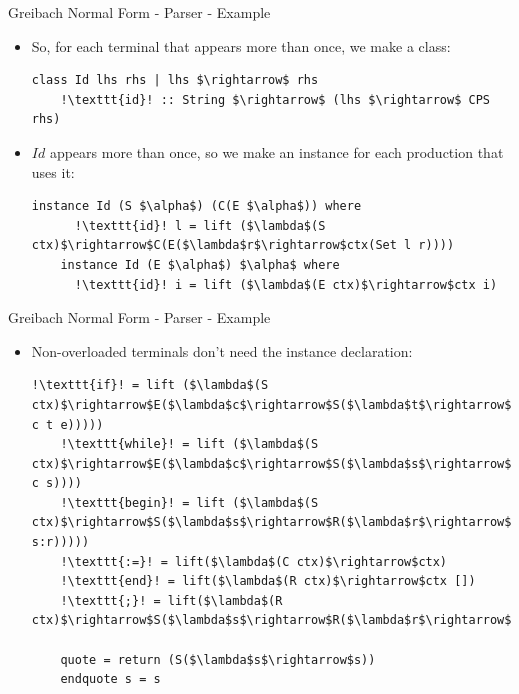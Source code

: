 \documentclass[10pt]{beamer}
\begin{document}
\begin{frame}[fragile]{Greibach Normal Form - Parser - Example}

\begin{itemize}

\item So, for each terminal that appears more than once, we make a class:
\begin{lstlisting}[mathescape=true, escapechar=!]
	class Id lhs rhs | lhs $\rightarrow$ rhs
	!\texttt{id}! :: String $\rightarrow$ (lhs $\rightarrow$ CPS rhs)
\end{lstlisting}

\item $Id$ appears more than once, so we make an instance for each production that uses it:
\begin{lstlisting}[mathescape=true, escapechar=!]
	instance Id (S $\alpha$) (C(E $\alpha$)) where
	  !\texttt{id}! l = lift ($\lambda$(S ctx)$\rightarrow$C(E($\lambda$r$\rightarrow$ctx(Set l r))))
	instance Id (E $\alpha$) $\alpha$ where
	  !\texttt{id}! i = lift ($\lambda$(E ctx)$\rightarrow$ctx i)
\end{lstlisting}
\end{itemize}

\end{frame}

\begin{frame}[fragile]{Greibach Normal Form - Parser - Example}

\begin{itemize}

\item Non-overloaded terminals don't need the instance declaration:
\begin{lstlisting}[mathescape=true, escapechar=!]
	!\texttt{if}! = lift ($\lambda$(S ctx)$\rightarrow$E($\lambda$c$\rightarrow$S($\lambda$t$\rightarrow$S($\lambda$e$\rightarrow$ctx(If c t e)))))
	!\texttt{while}! = lift ($\lambda$(S ctx)$\rightarrow$E($\lambda$c$\rightarrow$S($\lambda$s$\rightarrow$ctx(While c s))))
	!\texttt{begin}! = lift ($\lambda$(S ctx)$\rightarrow$S($\lambda$s$\rightarrow$R($\lambda$r$\rightarrow$ctx(Begin s:r)))))
	!\texttt{:=}! = lift($\lambda$(C ctx)$\rightarrow$ctx)
	!\texttt{end}! = lift($\lambda$(R ctx)$\rightarrow$ctx [])
	!\texttt{;}! = lift($\lambda$(R ctx)$\rightarrow$S($\lambda$s$\rightarrow$R($\lambda$r$\rightarrow$ctx(s:r))))
	
	quote = return (S($\lambda$s$\rightarrow$s))
	endquote s = s
\end{lstlisting}
\end{itemize}

\end{frame}
\end{document}
